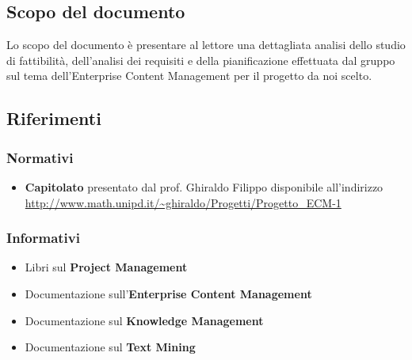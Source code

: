 \subsection{Scopo del documento}
Lo scopo del documento è presentare al lettore una dettagliata analisi dello studio di fattibilità, dell'analisi dei requisiti e della pianificazione effettuata dal gruppo \GRUPPO{} sul tema dell'Enterprise Content Management per il progetto da noi scelto.

\subsection{Riferimenti}

\subsubsection{Normativi}
\begin{itemize}
\item \textbf{Capitolato} presentato dal prof. Ghiraldo Filippo disponibile all'indirizzo \url{http://www.math.unipd.it/~ghiraldo/Progetti/Progetto\_ECM-1}
\end{itemize}

\subsubsection{Informativi}
\begin{itemize}
\item Libri sul \textbf{Project Management}
\item Documentazione sull'\textbf{Enterprise Content Management}
\item Documentazione sul \textbf{Knowledge Management}
\item Documentazione sul \textbf{Text Mining}
\end{itemize}
